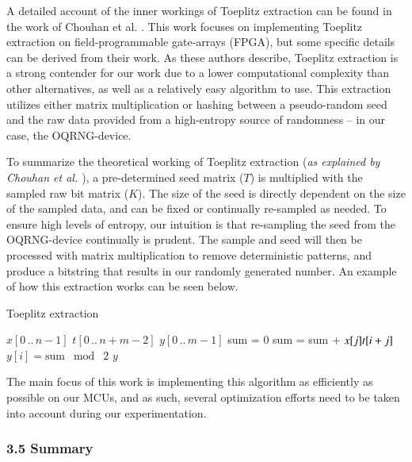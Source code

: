 \documentclass{sigchi}
\begin{document}
A detailed account of the inner workings of Toeplitz extraction can be found in the work of Chouhan et al. \cite{toeplitz-desc}. This work focuses on implementing Toeplitz extraction on field-programmable gate-arrays (FPGA), but some specific details can be derived from their work. As these authors describe, Toeplitz extraction is a strong contender for our work due to a lower computational complexity than other alternatives, as well as a relatively easy algorithm to use. This extraction utilizes either matrix multiplication or hashing between a pseudo-random seed and the raw data provided from a high-entropy source of randomness -- in our case, the OQRNG-device.

To summarize the theoretical working of Toeplitz extraction (\emph{as explained by Chouhan et al. \cite{toeplitz-desc}}), a pre-determined seed matrix (\(T\)) is multiplied with the sampled raw bit matrix (\(K\)). The size of the seed is directly dependent on the size of the sampled data, and can be fixed or continually re-sampled as needed. To ensure high levels of entropy, our intuition is that re-sampling the seed from the OQRNG-device continually is prudent. The sample and seed will then be processed with matrix multiplication to remove deterministic patterns, and produce a bitstring that results in our randomly generated number. An example of how this extraction works can be seen below.

\begin{algorithm}[ht] \caption{Toeplitz extraction}\label{alg:bit-conv}
\begin{algorithmic}[1] \REQUIRE \(x[0\,..\,n-1]\)  \REQUIRE \(t[0\,..\,n+m-2]\)  \ENSURE \(y[0\,..\,m-1]\) 
 \STATE sum = 0  \STATE
sum = sum + \(x[j] \* t[i + j]\) \ENDFOR \STATE \(y[i] =
\mathrm{sum}\;\bmod\;2\) \ENDFOR \RETURN \(y\) \end{algorithmic} \end{algorithm}

The main focus of this work is implementing this algorithm as efficiently as possible on our MCUs, and as such, several optimization efforts need to be taken into account during our experimentation.

\subsubsection{3.5 Summary}\label{summary}
\end{document}
